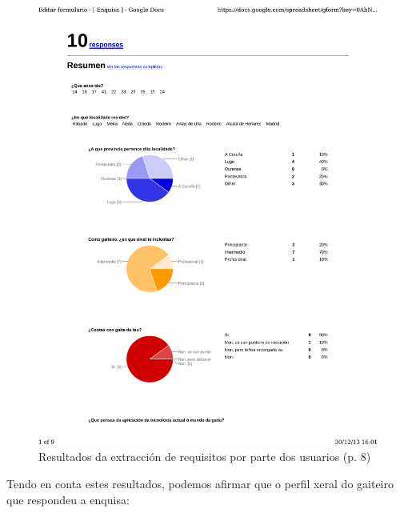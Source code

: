   \begin{figure}[htbp]
   \centering
   \includegraphics[scale=0.7,page=8,keepaspectratio=true]{./imagenes/enquisa.pdf}
   \caption{Resultados da extracción de requisitos por parte dos usuarios (p. 8)}
   \label{figura:ResultadosExtraccionRequisitosUsuarios8}
  \end{figure}

  Tendo en conta estes resultados, podemos afirmar que o perfil xeral do
  gaiteiro que respondeu a enquisa:

